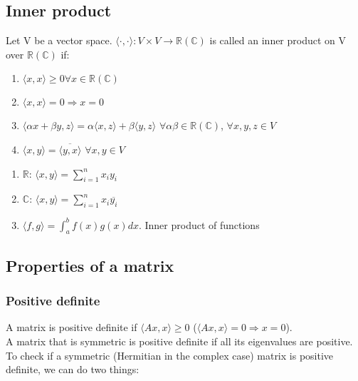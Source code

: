 \documentclass[a4paper, 12pt]{article}
\begin{document}
\subsection{Inner product}

\begin{mydef}
	Let V be a vector space. $\langle\cdot,\cdot\rangle: V \times V \rightarrow \mathbb{R}(\mathbb{C})$ is called an inner product on V over $\mathbb{R}(\mathbb{C})$ if:
	\begin{enumerate}[label=(\roman*)]
		\item $\langle x, x \rangle \geq 0 $\:$\forall x \in \mathbb{R}(\mathbb{C})$
		\item $\langle x, x \rangle = 0 \Rightarrow x=0$
		\item $\langle \alpha x + \beta y, z \rangle = \alpha \langle x, z \rangle + \beta \langle y,z \rangle$ \: $\forall \alpha \beta \in \mathbb{R}(\mathbb{C})$, \: $\forall x,y,z \in V $
		\item $\langle x,y\rangle = \overline{\langle y,x \rangle}$ \:$\forall x,y \in V$
	\end{enumerate}
\end{mydef}

\begin{myex}
	\begin{enumerate}
		\item $\mathbb{R}$: \: $\langle x,y\rangle = \sum_{i=1}^{n}x_iy_i$
		\item $\mathbb{C}$: \: $\langle x,y\rangle = \sum_{i=1}^{n}x_i\overline{y_i}$
		\item $\langle f,g\rangle = \int_{a}^{b}f(x)g(x)dx$. Inner product of functions
	\end{enumerate}
\end{myex}

\subsection{Properties of a matrix}

\subsubsection{Positive definite}
A matrix is positive definite if $\langle Ax,x\rangle \geq 0$ ($\langle Ax,x\rangle = 0 \Rightarrow x=0$).\\
A matrix that is symmetric is positive definite if all its eigenvalues are positive.\\

To check if a symmetric (Hermitian in the complex case) matrix is positive definite, we can do two things:
\end{document}
